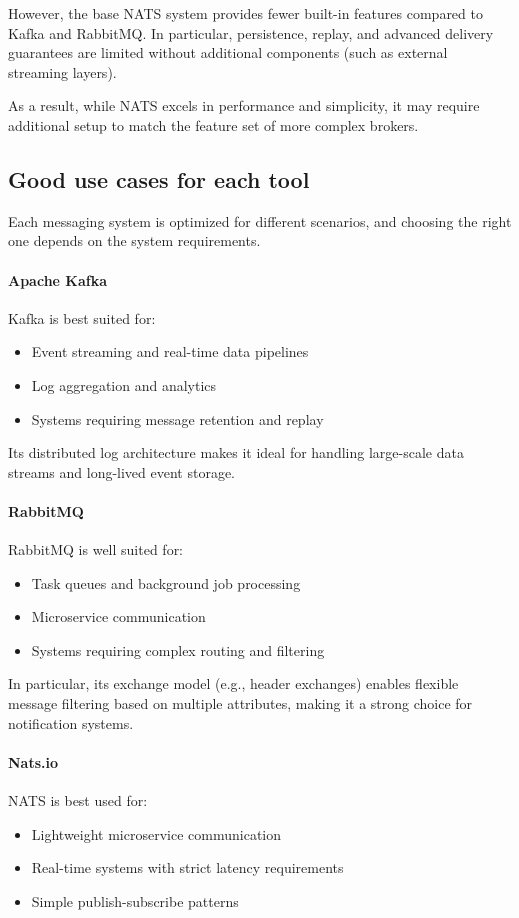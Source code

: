 However, the base NATS system provides fewer built-in features compared to Kafka and RabbitMQ. In particular, persistence, replay, and advanced delivery guarantees are limited without additional components (such as external streaming layers).

As a result, while NATS excels in performance and simplicity, it may require additional setup to match the feature set of more complex brokers.

\subsection{Good use cases for each tool}

Each messaging system is optimized for different scenarios, and choosing the right one depends on the system requirements.

\paragraph{Apache Kafka}
Kafka is best suited for:
\begin{itemize}
    \item Event streaming and real-time data pipelines
    \item Log aggregation and analytics
    \item Systems requiring message retention and replay
\end{itemize}

Its distributed log architecture makes it ideal for handling large-scale data streams and long-lived event storage.

\paragraph{RabbitMQ}
RabbitMQ is well suited for:
\begin{itemize}
    \item Task queues and background job processing
    \item Microservice communication
    \item Systems requiring complex routing and filtering
\end{itemize}

In particular, its exchange model (e.g., header exchanges) enables flexible message filtering based on multiple attributes, making it a strong choice for notification systems.

\paragraph{Nats.io}
NATS is best used for:
\begin{itemize}
    \item Lightweight microservice communication
    \item Real-time systems with strict latency requirements
    \item Simple publish-subscribe patterns
\end{itemize}

